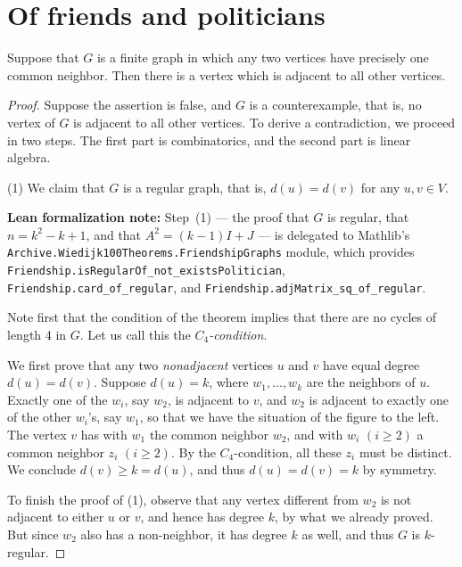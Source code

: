 \chapter{Of friends and politicians}

\begin{theorem}
  \label{friendship}
  \leanok
  Suppose that $G$ is a finite graph in which any two vertices have precisely one common neighbor.
  Then there is a vertex which is adjacent to all other vertices.
\end{theorem}
\begin{proof}
  Suppose the assertion is false, and $G$ is a counterexample, that is, no vertex of $G$ is
  adjacent to all other vertices. To derive a contradiction,
   we proceed in two steps. The first part is combinatorics, and the second part is linear algebra.

(1) We claim that $G$ is a regular graph, that is, $d(u) = d(v)$ for any $u, v \in V$.

\textbf{Lean formalization note:} Step~(1) — the proof that $G$ is regular, that
$n = k^2 - k + 1$, and that $A^2 = (k-1)I + J$ — is delegated to Mathlib's
\texttt{Archive.Wiedijk100Theorems.FriendshipGraphs} module, which provides
\texttt{Friendship.isRegularOf\_not\_existsPolitician},
\texttt{Friendship.card\_of\_regular}, and
\texttt{Friendship.adjMatrix\_sq\_of\_regular}.

Note first that the condition of the theorem implies that there are no cycles of length
4 in $G$. Let us call this the \emph{$C_4$-condition}.

We first prove that any two \emph{nonadjacent} vertices $u$ and $v$ have equal degree $d(u) = d(v)$.
Suppose $d(u) = k$, where $w_1, \dots, w_k$ are the neighbors of $u$. Exactly one of the
 $w_i$, say $w_2$, is adjacent to $v$, and $w_2$ is adjacent to exactly one of the other $w_i$'s,
 say $w_1$, so that we have the situation of the figure to the left. The vertex $v$ has with $w_1$
 the common neighbor $w_2$, and with $w_i$ $(i \geq 2)$ a common neighbor $z_i$ $(i \geq 2)$.
 By the $C_4$-condition, all these $z_i$ must be distinct. We conclude $d(v) \geq k = d(u)$, and
 thus $d(u) = d(v) = k$ by symmetry.

To finish the proof of (1), observe that any vertex different from $w_2$ is not adjacent to either
 $u$ or $v$, and hence has degree $k$, by what we already proved. But since $w_2$ also has a
 non-neighbor, it has degree $k$ as well, and thus $G$ is $k$-regular.


\end{proof}
